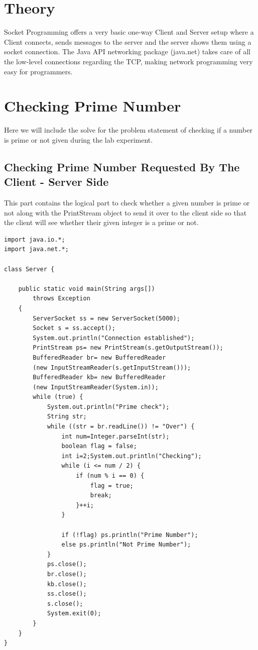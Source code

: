 \documentclass[11pt]{article}
\begin{document}
\section{Theory}
Socket Programming offers a very basic one-way Client and Server setup where a Client connects, sends messages to the server and the server shows them using a socket connection. The Java API networking package (java.net) takes care of all the low-level connections regarding the TCP, making network programming very easy for programmers.




\section{Checking Prime Number}
Here we will include the solve for the problem statement of checking if a number is prime or not given during the lab experiment.
\newpage
\subsection{Checking Prime Number Requested By The Client - Server Side }
This part contains the logical part to check whether a given number is prime or not along with the PrintStream object to send it over to the client side so that the client will see whether their given integer is a prime or not.


\begin{verbatim}
import java.io.*;
import java.net.*;

class Server {

	public static void main(String args[])
		throws Exception
	{
		ServerSocket ss = new ServerSocket(5000);
		Socket s = ss.accept();
		System.out.println("Connection established");
		PrintStream ps= new PrintStream(s.getOutputStream());
		BufferedReader br= new BufferedReader
		(new InputStreamReader(s.getInputStream()));
		BufferedReader kb= new BufferedReader
		(new InputStreamReader(System.in));
		while (true) {
			System.out.println("Prime check");
			String str;
			while ((str = br.readLine()) != "Over") {
				int num=Integer.parseInt(str);
				boolean flag = false;
				int i=2;System.out.println("Checking");
				while (i <= num / 2) {
					if (num % i == 0) {
						flag = true;
						break;
					}++i;
				}

				if (!flag) ps.println("Prime Number");
				else ps.println("Not Prime Number");	
			}
			ps.close();
			br.close();
			kb.close();
			ss.close();
			s.close();
			System.exit(0);
		} 
	}
}

\end{verbatim}
\end{document}
